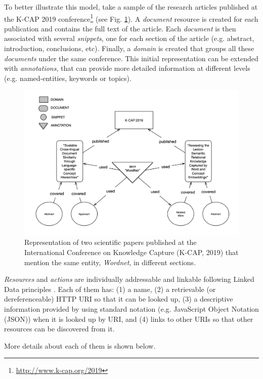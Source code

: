 To better illustrate this model, take a sample of the research articles published at the K-CAP 2019 conference\footnote{\url{http://www.k-cap.org/2019}} (see Fig. \ref{fig:librairy-model}). A \textit{document} resource is created for each publication and contains the full text of the article. Each \textit{document} is then associated with several \textit{snippets}, one for each section of the article (e.g. abstract, introduction, conclusions, etc). Finally, a \textit{domain} is created that groups all these \textit{documents} under the same conference. This initial representation can be extended with \textit{annotations}, that can provide more detailed information at different levels (e.g. named-entities, keywords or topics).

% 
\begin{figure}
  \center
  \includegraphics[scale=0.55]{model}
  \caption{Representation of two scientific papers published at the International Conference on Knowledge Capture (K-CAP, 2019) that mention the same entity, \textit{Wordnet}, in different sections.}
  \label{fig:librairy-model}
\end{figure}

\textit{Resources} and \textit{actions} are individually addressable and linkable \citep{Turchi2012a} following Linked Data principles \citep{Bizer2009}. Each of them has: (1) a name, (2) a retrievable (or dereferenceable) HTTP URI so that it can be looked up, (3) a descriptive information provided by using standard notation (e.g. JavaScript Object Notation (JSON)) when it is  looked up by URI, and (4) links to other URIs so that other resources can be discovered from it.

More details about each of them is shown below.

